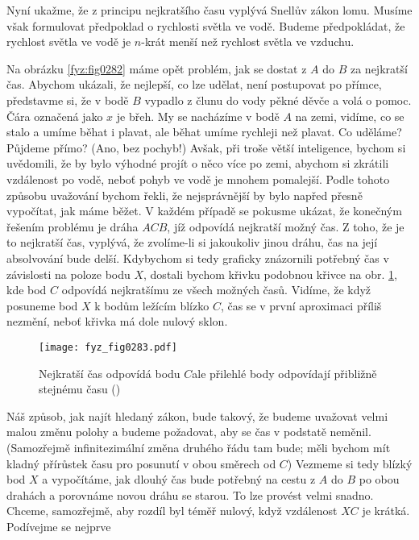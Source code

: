     Nyní ukažme, že z principu nejkratšího času vyplývá Snellův zákon lomu. Musíme však formulovat 
    předpoklad o rychlosti světla ve vodě. Budeme předpokládat, že rychlost světla ve vodě je 
    \(n\)-krát menší než rychlost světla ve vzduchu.
    
    Na obrázku \ref{fyz:fig0282} máme opět problém, jak se dostat z \(A\) do \(B\) za nejkratší čas. 
    Abychom ukázali, že nejlepší, co lze udělat, není postupovat po přímce, představme si, že v 
    bodě \(B\) vypadlo z člunu do vody pěkné děvče a volá o pomoc. Čára označená jako \(x\) je 
    břeh. My se nacházíme v bodě \(A\) na zemi, vidíme, co se stalo a umíme běhat i plavat, ale 
    běhat umíme rychleji než plavat. Co uděláme? Půjdeme přímo? (Ano, bez pochyb!) Avšak, při troše 
    větší inteligence, bychom si uvědomili, že by bylo výhodné projít o něco více po zemi, abychom 
    si zkrátili vzdálenost po vodě, neboť pohyb ve vodě je mnohem pomalejší. Podle tohoto způsobu 
    uvažování bychom řekli, že nejsprávnější by bylo napřed přesně vypočítat, jak máme běžet. V 
    každém případě se pokusme ukázat, že konečným řešením problému je dráha \(ACB\), jíž odpovídá 
    nejkratší možný čas. Z toho, že je to nejkratší čas, vyplývá, že zvolíme-li si jakoukoliv jinou 
    dráhu, čas na její absolvování bude delší. Kdybychom si tedy graficky znázornili potřebný čas v 
    závislosti na poloze bodu \(X\), dostali bychom křivku podobnou křivce na obr. 
    \ref{fyz:fig0283}, kde bod \(C\) odpovídá nejkratšímu ze všech možných časů. Vidíme, že když 
    posuneme bod \(X\) k bodům ležícím blízko \(C\), čas se v první aproximaci příliš nezmění, 
    neboť křivka má dole nulový sklon.
    \begin{figure}[ht!] %
      \centering
      \texttt{[image: fyz\_fig0283.pdf]}
      \caption{Nejkratší čas odpovídá bodu \(C\)ale přilehlé body odpovídají přibližně stejnému času
               (\cite[s.~349]{Feynman01})}
      \label{fyz:fig0283}
    \end{figure}
    Náš způsob, jak najít hledaný zákon, bude takový, že budeme uvažovat velmi malou změnu polohy a 
    budeme požadovat, aby se čas v podstatě neměnil. (Samozřejmě infinitezimální změna druhého řádu 
    tam bude; měli bychom mít kladný přírůstek času pro posunutí v obou směrech od \(C\)) Vezmeme 
    si tedy blízký bod \(X\) a vypočítáme, jak dlouhý čas bude potřebný na cestu z \(A\) do \(B\) 
    po obou drahách a porovnáme novou dráhu se starou. To lze provést velmi snadno. Chceme, 
    samozřejmě, aby rozdíl byl téměř nulový, když vzdálenost \(XC\) je krátká. Podívejme se nejprve 
